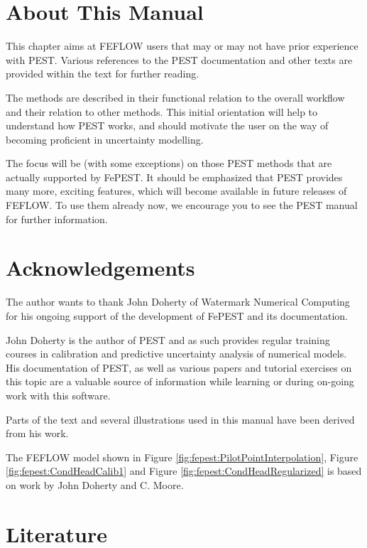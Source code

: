\chapter{About This Manual}

\label{sec:fepest:ThisManual}

This chapter aims at FEFLOW users that may or may not have prior experience with PEST.
Various references to the PEST documentation and other texts are provided within the text for further reading. 

The methods are described in their functional relation to the overall workflow and their relation to other methods. This initial orientation will help to understand how PEST works, and should motivate the user on the way of becoming proficient in uncertainty modelling.

The focus will be (with some exceptions) on those PEST methods that are actually supported by FePEST. It should be emphasized that PEST provides many more, exciting features, which will become available in future releases of FEFLOW. To use them already now, we encourage you to see the PEST manual for further information.

\chapter{Acknowledgements}

The author wants to thank John Doherty of Watermark Numerical Computing for his ongoing support of the development of FePEST and its documentation.

John Doherty is the author of PEST and as such provides regular training courses in calibration and predictive uncertainty analysis of numerical models. His documentation of PEST, as well as various papers and tutorial exercises on this topic are a valuable source of information while learning or during on-going work with this software.

Parts of the text and several illustrations used in this manual have been derived from his work.

The FEFLOW model shown in Figure \ref{fig:fepest:PilotPointInterpolation}, Figure \ref{fig:fepest:CondHeadCalib1} and Figure \ref{fig:fepest:CondHeadRegularized} is based on work by John Doherty and C. Moore.

\chapter{Literature}
\label{sec:fepest:literatureReview}

